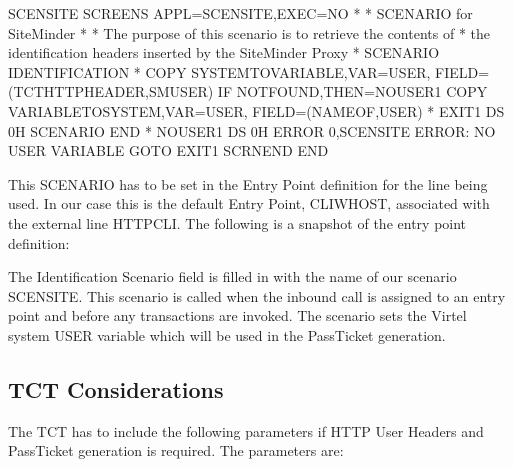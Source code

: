 \documentclass[letterpaper,10pt,english]{sphinxmanual}
\begin{document}
\begin{sphinxVerbatim}[commandchars=\\\{\}]
SCENSITE SCREENS APPL=SCENSITE,EXEC=NO
*
* SCENARIO for SiteMinder
*
* The purpose of this scenario is to retrieve the contents of
* the identification headers inserted by the SiteMinder Proxy
*
SCENARIO IDENTIFICATION
*
        COPY\PYGZdl{} SYSTEM\PYGZhy{}TO\PYGZhy{}VARIABLE,VAR=\PYGZsq{}USER\PYGZsq{}, \PYGZhy{}
                FIELD=(TCT\PYGZhy{}HTTP\PYGZhy{}HEADER,SM\PYGZbs{}\PYGZus{}USER)
        IF\PYGZdl{} NOT\PYGZhy{}FOUND,THEN=NOUSER1
        COPY\PYGZdl{} VARIABLE\PYGZhy{}TO\PYGZhy{}SYSTEM,VAR=\PYGZsq{}USER\PYGZsq{}, \PYGZhy{}
                FIELD=(NAME\PYGZhy{}OF,USER)
*
EXIT1 DS 0H
        SCENARIO END
*
NOUSER1 DS 0H
        ERROR\PYGZdl{} 0,\PYGZsq{}SCENSITE ERROR: NO USER VARIABLE\PYGZsq{}
        GOTO\PYGZdl{} EXIT1
        SCRNEND
        END
\end{sphinxVerbatim}

\sphinxAtStartPar
This SCENARIO has to be set in the Entry Point definition for the line being used. In our case this is the default Entry Point, CLIWHOST, associated with the external line HTTP\sphinxhyphen{}CLI. The following is a snapshot of the entry point definition:\sphinxhyphen{}

\sphinxAtStartPar
{} 

\sphinxAtStartPar
The Identification Scenario field is filled in with the name of our scenario SCENSITE. This scenario is called when the inbound call is assigned to an entry point and before any transactions are invoked. The scenario sets the Virtel system USER variable which will be used in the PassTicket generation.


\subsection{TCT Considerations}
\label{\detokenize{connectivity_guide:tct-considerations}}
\sphinxAtStartPar
The TCT has to include the following parameters if HTTP User Headers and PassTicket generation is required. The parameters are:\sphinxhyphen{}

\begin{sphinxVerbatim}[commandchars=\\\{\}]
                              
              
  
                                    
\end{sphinxVerbatim}
\end{document}
